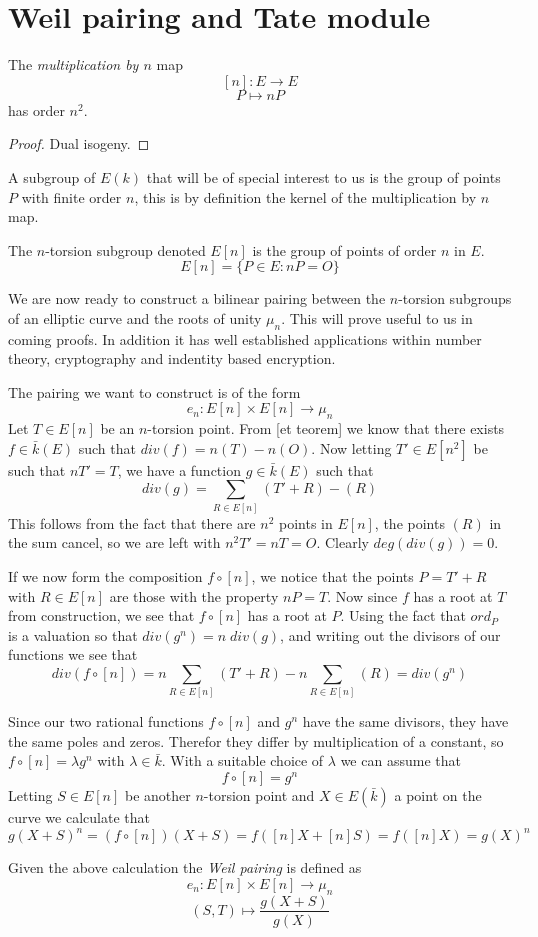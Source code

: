 \section{Weil pairing and Tate module}

\begin{prop}
 The \emph{multiplication by $n$} map
$$ [n] : E \rightarrow E $$
$$ P \mapsto nP $$
has order $n^2$.
\end{prop}
\begin{proof}
 Dual isogeny.
\end{proof}

A subgroup of $E(k)$ that will be of special interest to us is the group of points $P$
with finite order $n$, this is by definition the kernel of the multiplication by $n$ map.
\begin{mydef}
 The $n$-torsion subgroup denoted $E[n]$ is the group of points of order $n$ in $E$.
$$ E[n] = \{ P\in E : nP = O \} $$
\end{mydef}

We are now ready to construct a bilinear pairing between the $n$-torsion subgroups of
an elliptic curve and the roots of unity $\mu_n$. This will prove useful to us in coming
proofs. In addition it has well established applications within number theory, cryptography
and indentity based encryption.

The pairing we want to construct is of the form
$$ e_n : E[n] \times E[n] \rightarrow \mu_n $$
Let $T\in E[n]$ be an $n$-torsion point. From [et teorem] we know that there exists
$f \in \bar{k}(E)$ such that $div(f) = n(T) - n(O)$. Now letting $T' \in E[n^2]$ be such
that $nT' = T$, we have a function $g \in \bar{k}(E)$ such that
$$ div(g) = \sum_{R\in E[n]} (T'+R)-(R) $$
This follows from the fact that there are $n^2$ points in $E[n]$, the points $(R)$ in the
sum cancel, so we are left with $n^2 T' = nT = O$. Clearly $deg(div(g)) = 0$.

If we now form the composition $f \circ [n]$, we notice that the points $P = T' + R$ with
$R\in E[n]$ are those with the property $nP = T$. Now since $f$ has a root at $T$ from
construction, we see that $f \circ [n]$ has a root at $P$. Using the fact that $ord_P$ is a valuation
so that $div(g^n) = n\;div(g)$, and writing out the divisors of our functions we see that
$$ div(f \circ [n]) = n\sum_{R\in E[n]} (T'+R) - n\sum_{R\in E[n]} (R) = div(g^n) $$

Since our two rational functions $f \circ [n]$ and $g^n$ have the same divisors, they have the
same poles and zeros. Therefor they differ by multiplication of a constant, so
$f \circ [n] = \lambda g^n$ with $\lambda \in \bar{k}$. With a suitable choice of $\lambda$
we can assume that 
$$f \circ [n] = g^n$$
Letting $S \in E[n]$ be another $n$-torsion point and $X \in E(\bar{k})$ a point on the curve we calculate that
$$ g(X + S)^n = (f \circ [n])(X + S) = f([n]X + [n]S) = f([n]X) = g(X)^n $$
\begin{mydef}
 Given the above calculation the \emph{Weil pairing} is defined as
$$ e_n : E[n] \times E[n] \rightarrow \mu_n$$
$$ (S,T) \mapsto \frac{g(X + S)}{g(X)} $$
\end{mydef}

